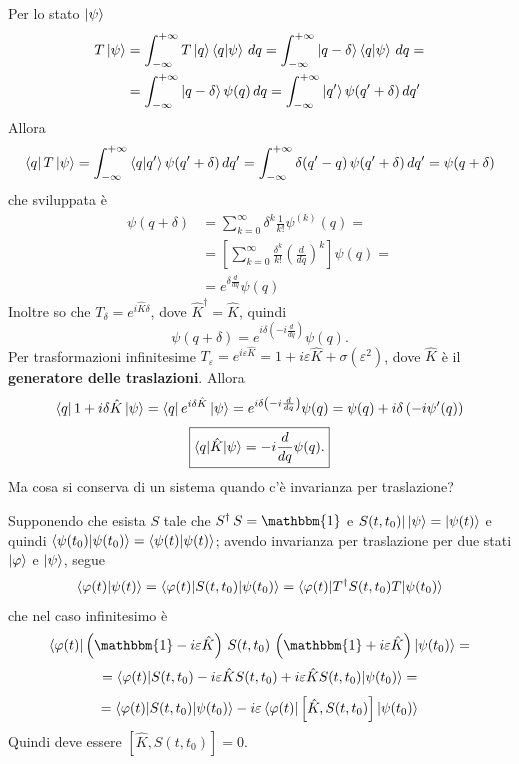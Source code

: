 \bigskip
\noindent
Per lo stato \( \ket{\psi} \)
\begin{align*}
T \ket{\psi} &= \int_{-\infty}^{+\infty} T \ket{q} \braket{q|\psi} \, dq = \int_{-\infty}^{+\infty} \ket{q - \delta} \braket{q|\psi} \, dq = \\
&= \int_{-\infty}^{+\infty} \ket{q - \delta} \psi(q) \, dq = \int_{-\infty}^{+\infty} \ket{q^\prime} \psi(q^\prime + \delta) \, dq^\prime
\end{align*}
Allora
\[
\bra{q} T \ket{\psi} = \int_{-\infty}^{+\infty} \braket{q|q^\prime} \psi(q^\prime + \delta) \, dq^\prime = \int_{-\infty}^{+\infty} \delta(q^\prime - q) \, \psi(q^\prime + \delta) \, dq^\prime = \psi(q + \delta)
\]
che sviluppata è
\begin{align*}
\psi(q + \delta) &= \sum_{k = 0}^\infty \delta^k \frac{1}{k!} \psi^{(k)}(q) = \\
&= \left[ \sum_{k = 0}^\infty \frac{\delta^k}{k!} \left( \frac{d}{dq} \right)^k \right] \psi(q) = \\
&= e^{\delta \frac{d}{dq}} \psi(q)
\end{align*}
Inoltre so che \(T_\delta = e^{i \hat{K} \delta}\), dove \(\hat{K}^\dag = \hat{K}\), quindi
\[
\psi(q + \delta) = e^{i \delta \left( -i \frac{d}{dq} \right)} \psi(q).
\]
Per trasformazioni infinitesime \( T_\varepsilon = e^{i \varepsilon \hat{K}} = 1 + i \varepsilon \hat{K} + \sigma(\varepsilon^2) \), dove \( \hat{K} \) è il \textbf{generatore delle traslazioni}. Allora
\[
\bra{q} 1 + i \delta \hat{K} \ket{\psi} =  \bra{q} e^{i \delta \hat{K}} \ket{\psi} = e^{i \delta \left( -i \frac{d}{dq} \right)} \psi(q) = \psi(q) + i \delta \left( -i \psi^\prime(q) \right)
\]
\[
\boxed{
\braket{q|\hat{K}|\psi} = -i \frac{d}{dq} \psi(q).
}
\]
Ma cosa si conserva di un sistema quando c'è invarianza per traslazione?

\bigskip
\noindent
Supponendo che esista \( S \) tale che \( S^\dag \, S = \mathbbm{1} \) e \( S(t, t_0) |\ket{\psi} = \ket{\psi(t)} \) e quindi \( \braket{\psi(t_0)|\psi(t_0)} = \braket{\psi(t)|\psi(t)} \); avendo invarianza per traslazione per due stati \( \ket{\varphi} \) e \( \ket{\psi} \), segue
\[
\braket{\varphi(t)|\psi(t)} = \braket{\varphi(t)|S(t, t_0)|\psi(t_0)} = \braket{\varphi(t)|T^\dag S(t, t_0) T|\psi(t_0)}
\]
che nel caso infinitesimo è
\[
\braket{\varphi(t)|\left( \mathbbm{1} - i \varepsilon \hat{K} \right) \, S(t, t_0) \, \left( \mathbbm{1} + i \varepsilon \hat{K} \right) | \psi(t_0)} =
\]
\[
= \braket{\varphi(t)|S(t, t_0) - i \varepsilon \hat{K} S(t, t_0) + i \varepsilon \hat{K} S(t, t_0)|\psi(t_0)} =
\]
\[
= \braket{\varphi(t)|S(t, t_0)|\psi(t_0)} - i \varepsilon \braket{\varphi(t)|\left[ \hat{K}, S(t, t_0) \right]|\psi(t_0)}
\]
Quindi deve essere \( \left[ \hat{K}, S(t, t_0) \right] = 0 \).

